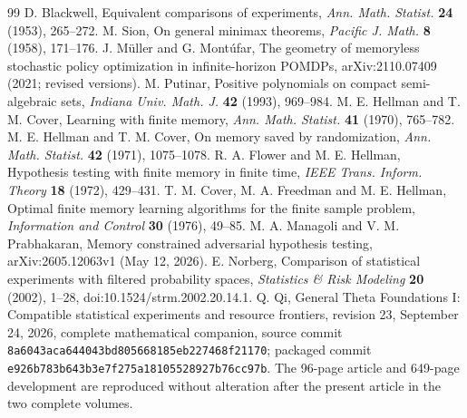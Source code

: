 \documentclass[11pt]{amsart}
\theoremstyle{definition}\newtheorem{definition}[theorem]{Definition}
\theoremstyle{remark}\newtheorem{remark}[theorem]{Remark}
\newcommand{\1}{\mathbf 1}
\begin{document}
\begin{thebibliography}{99}
 D. Blackwell, Equivalent comparisons of experiments,
\emph{Ann. Math. Statist.} \textbf{24} (1953), 265--272.
 M. Sion, On general minimax theorems,
\emph{Pacific J. Math.} \textbf{8} (1958), 171--176.
 J. M\"uller and G. Mont\'ufar, The geometry of memoryless
stochastic policy optimization in infinite-horizon POMDPs,
arXiv:2110.07409 (2021; revised versions).
 M. Putinar, Positive polynomials on compact semi-algebraic
sets, \emph{Indiana Univ. Math. J.} \textbf{42} (1993), 969--984.
 M. E. Hellman and T. M. Cover, Learning with finite memory,
\emph{Ann. Math. Statist.} \textbf{41} (1970), 765--782.
 M. E. Hellman and T. M. Cover, On memory saved by
randomization, \emph{Ann. Math. Statist.} \textbf{42} (1971), 1075--1078.
 R. A. Flower and M. E. Hellman, Hypothesis testing with
finite memory in finite time, \emph{IEEE Trans. Inform. Theory}
\textbf{18} (1972), 429--431.
 T. M. Cover, M. A. Freedman and M. E. Hellman, Optimal
finite memory learning algorithms for the finite sample problem,
\emph{Information and Control} \textbf{30} (1976), 49--85.
 M. A. Managoli and V. M. Prabhakaran, Memory constrained
adversarial hypothesis testing, arXiv:2605.12063v1 (May 12, 2026).
 E. Norberg, Comparison of statistical experiments with
filtered probability spaces, \emph{Statistics \& Risk Modeling}
\textbf{20} (2002), 1--28, doi:10.1524/strm.2002.20.14.1.
 Q. Qi, General Theta Foundations I: Compatible
statistical experiments and resource frontiers, revision 23,
September 24, 2026, complete mathematical companion, source commit
\texttt{8a6043aca644043bd805668185eb227468f21170}; packaged commit
\texttt{e926b783b643b3e7f275a18105528927b76cc97b}.
The 96-page article and 649-page development are reproduced without
alteration after the present article in the two complete volumes.
\end{thebibliography}
\end{document}
